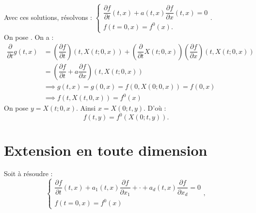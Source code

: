 \documentclass[12pt,a4paper]{article}
\newcommand\diff[2]{\dfrac{\partial #1}{\partial #2}}
\begin{document}
	
	Avec ces solutions, résolvons : $\begin{cases}
		\diff ft(t,x) + a(t,x) \diff fx (t,x) = 0\\
		f(t=0,x) = f^0(x) .
	\end{cases}$.\\
	On pose . On a :
	\[
	\begin{aligned}
		\diff{}t g(t,x) &= \left(\diff ft\right)(t,X(t;0,x)) + \left(\diff{}t X(t;0,x)\right)\left(\diff fx\right)(t,X(t;0,x))\\
		&= \left(\diff ft + a\diff fx\right)(t,X(t;0,x))\\
		&\implies g(t,x) = g(0,x) = f(0,X(0;0,x)) = f(0,x)\\
		&\implies f(t,X(t,0,x)) = f^0(x)
	\end{aligned}
	\]
	On pose $y = X(t;0,x)$. Ainsi $x = X(0;t,y)$. D'où :
	\begin{equation}
		f(t,y) = f^0(X(0;t,y)).
	\end{equation}
	
	\section{Extension en toute dimension}
	
	Soit à résoudre : 
	\begin{equation}
		\begin{cases}
			\diff ft (t,x) + a_1(t,x) \diff f{x_1} + \cdot + a_d(t,x)\diff f{x_d} = 0\\
			f(t=0,x) = f^0(x)
		\end{cases},
	\end{equation}
	
\end{document}
